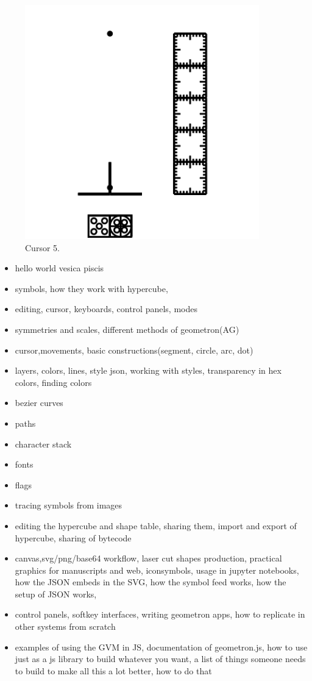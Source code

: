 \begin{figure}
	\centering
	\includegraphics[width=4in]{figures/web2d/cursor5.png}
	\caption[cursor5]
	{Cursor 5.}
\end{figure}





\begin{itemize}
\tightlist
\item
hello world vesica piscis
\item
symbols, how they work with hypercube, 
\item
editing, cursor, keyboards, control panels, modes
\item
symmetries and scales, different methods of geometron(AG)
\item
cursor,movements, basic constructions(segment, circle, arc, dot)
\item
layers, colors, lines, style json, working with styles, transparency in hex colors, finding colors
\item
bezier curves
\item
paths
\item
character stack
\item
fonts
\item
flags
\item
tracing symbols from images
\item
editing the hypercube and shape table, sharing them, import and export of hypercube, sharing of bytecode
\item
canvas,svg/png/base64 workflow, laser cut shapes production, practical graphics for manuscripts and web, iconsymbols, usage in jupyter notebooks, how the JSON embeds in the SVG, how the symbol feed works, how the setup of JSON works,
\item
control panels, softkey interfaces, writing geometron apps, how to replicate in other systems from scratch
\item
examples of using the GVM in JS, documentation of geometron.js, how to use just as a js library to build whatever you want, a list of things someone needs to build to make all this a lot better, how to do that
\end{itemize}